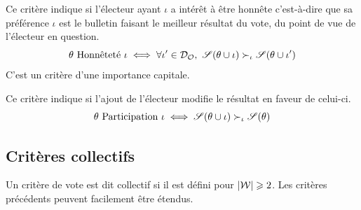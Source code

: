 \begin{definition}
	Ce critère indique si l'électeur ayant $\iota$ a intérêt à être honnête c'est-à-dire que sa préférence $\iota$ est le bulletin faisant le meilleur résultat du vote, du point de vue de l'électeur en question.
	\begin{equation}
		\theta \text{ Honnêteté } \iota \iff
		\forall \iota' \in \mathcal{D}_\mathcal{O}, \
		\mathscr{S}(\theta \cup \iota) \succ_\iota \mathscr{S}(\theta \cup \iota')
	\end{equation}
	C'est un critère d'une importance capitale.
\end{definition}

\begin{definition}
	Ce critère indique si l'ajout de l'électeur modifie le résultat en faveur de celui-ci.
	\begin{equation}
		\theta \text{ Participation } \iota \iff
		\mathscr{S}(\theta \cup \iota) \succ_\iota \mathscr{S}(\theta)
	\end{equation}
\end{definition}

\subsection{Critères collectifs}

Un critère de vote est dit collectif si il est défini pour $|\mathcal{W}| \geqslant 2$. Les critères précédents peuvent facilement être étendus.